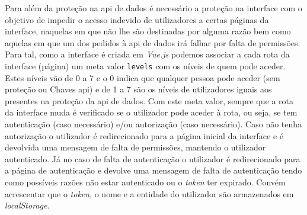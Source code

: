 Para além da proteção na \acrshort{api} de dados é necessário a proteção na interface com o objetivo de impedir o acesso indevido de utilizadores a certas páginas da interface, naquelas em que não lhe são destinadas por alguma razão bem como aquelas em que um dos pedidos à \acrshort{api} de dados irá falhar por falta de permissões. Para tal, como a interface é criada em \textit{Vue.js} podemos associar a cada rota da interface (página) um meta valor \texttt{levels} com os níveis de quem pode aceder. Estes níveis vão de 0 a 7 e o 0 indica que qualquer pessoa pode aceder (sem proteção ou Chaves \acrshort{api}) e de 1 a 7 são os níveis de utilizadores iguais aos presentes na proteção da \acrshort{api} de dados. Com este meta valor, sempre que a rota da interface muda é verificado se o utilizador pode aceder à rota, ou seja, se tem autenticação (caso necessário) e/ou autorização (caso necessário). Caso não tenha autorização o utilizador é redirecionado para a página inicial da interface e é devolvida uma mensagem de falta de permissões, mantendo o utilizador autenticado. Já no caso de falta de autenticação o utilizador é redirecionado para a página de autenticação e devolve uma mensagem de falta de autenticação tendo como possíveis razões não estar autenticado ou o \textit{token} ter expirado. Convém acrescentar que o \textit{token}, o nome e a entidade do utilizador são armazenados em \textit{localStorage}.


